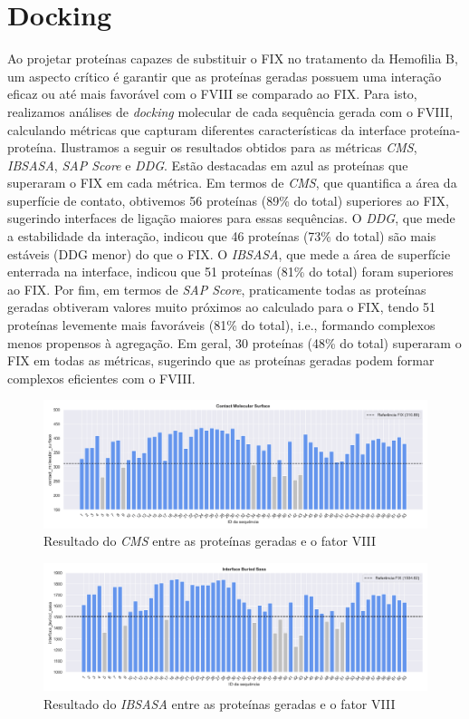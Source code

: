 \section{Docking}       

Ao projetar proteínas capazes de substituir o FIX no tratamento da Hemofilia B, um aspecto crítico é garantir que as 
proteínas geradas possuem uma interação eficaz ou até mais favorável com o FVIII se comparado ao FIX.
Para isto, realizamos análises de \textit{docking} molecular de cada sequência gerada com o FVIII,
calculando métricas que capturam diferentes características da interface proteína-proteína. 
Ilustramos a seguir os resultados obtidos para as métricas \textit{CMS}, \textit{IBSASA}, \textit{SAP Score} e \textit{DDG}.
Estão destacadas em azul as proteínas que superaram o FIX em cada métrica.
Em termos de \textit{CMS}, que quantifica a área da superfície de contato, obtivemos 56 proteínas (89\% do total) superiores ao FIX, 
sugerindo interfaces de ligação maiores para essas sequências.
O \textit{DDG}, que mede a estabilidade da interação, indicou que 46 proteínas (73\% do total) 
são mais estáveis (DDG menor) do que o FIX.
O \textit{IBSASA}, que mede a área de superfície enterrada na interface, indicou que 51 proteínas (81\% do total)
foram superiores ao FIX.
Por fim, em termos de \textit{SAP Score}, praticamente todas as proteínas geradas obtiveram valores muito próximos ao 
calculado para o FIX, tendo 51 proteínas levemente mais favoráveis (81\% do total), i.e., formando complexos menos propensos à agregação.
Em geral, 30 proteínas (48\% do total) superaram o FIX em todas as métricas,
sugerindo que as proteínas geradas podem formar complexos eficientes com o FVIII.

\begin{figure}[H]
    \centering
    \includegraphics[width=.9\linewidth]{figuras/plot_contact_molecular_surface.png}    
    \caption{Resultado do \textit{CMS} entre as proteínas geradas e o fator VIII}
\end{figure}

\begin{figure}[H]
    \centering
    \includegraphics[width=.9\linewidth]{figuras/plot_interface_buried_sasa.png}    
    \caption{Resultado do \textit{IBSASA} entre as proteínas geradas e o fator VIII}
\end{figure}

